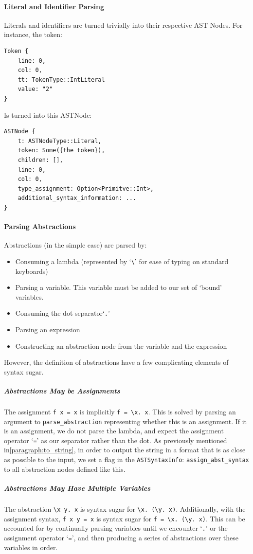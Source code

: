 \paragraph{Literal and Identifier Parsing}
Literals and identifiers are turned trivially into their respective AST Nodes. For instance, the token:
\begin{verbatim}
Token {
    line: 0,
    col: 0,
    tt: TokenType::IntLiteral
    value: "2"
}
\end{verbatim}
Is turned into this ASTNode:
\begin{verbatim}
ASTNode {
    t: ASTNodeType::Literal,
    token: Some({the token}),
    children: [],
    line: 0,
    col: 0,
    type_assignment: Option<Primitve::Int>,
    additional_syntax_information: ...
}
\end{verbatim}

\paragraph{Parsing Abstractions}
Abstractions (in the simple case) are parsed by:
\begin{itemize}
    \item Consuming a lambda (represented by `\verb|\|' for ease of typing on standard keyboards)
    \item Parsing a variable. This variable must be added to our set of `bound' variables.
    \item Consuming the dot separator`\verb|.|'
    \item Parsing an expression
    \item Constructing an abstraction node from the variable and the expression
\end{itemize}

However, the definition of abstractions have a few complicating elements of syntax sugar.

\subparagraph{Abstractions May be Assignments}
The assignment \verb|f x = x| is implicitly \verb|f = \x. x|. This is solved by parsing an argument to \verb|parse_abstraction| representing whether this is an assignment. If it is an assignment, we do not parse the lambda, and expect the assignment operator `\verb|=|' as our separator rather than the dot. As previously mentioned in\ref{paragraph:to_string}, in order to output the string in a format that is as close as possible to the input, we set a flag in the \verb|ASTSyntaxInfo|: \verb|assign_abst_syntax| to all abstraction nodes defined like this. 

\subparagraph{Abstractions May Have Multiple Variables}
The abstraction \verb|\x y. x| is syntax sugar for \newline\noindent\verb|\x. (\y. x)|. Additionally, with the assignment syntax, \verb|f x y = x| is syntax sugar for \newline\noindent\verb|f = \x. (\y. x)|. This can be accounted for by continually parsing variables until we encounter `\verb|.|' or the assignment operator `\verb|=|', and then producing a series of abstractions over these variables in order. 

